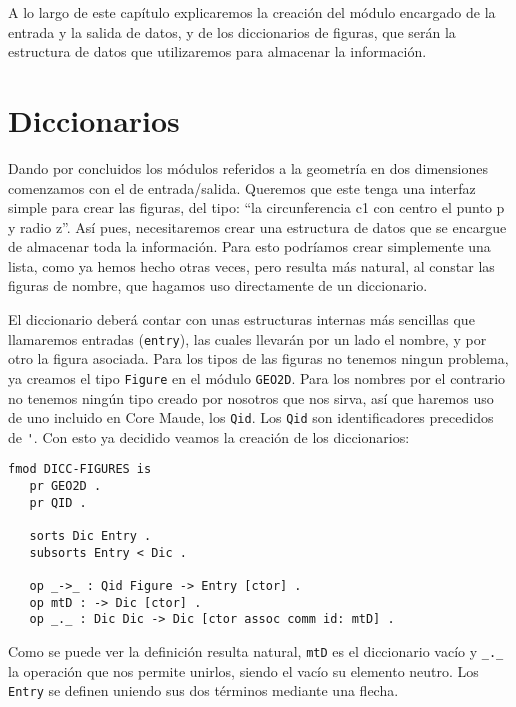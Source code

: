 
A lo largo de este capítulo explicaremos la creación del módulo encargado de la entrada y la salida de datos, y de los diccionarios de figuras, que serán la estructura de datos que utilizaremos para almacenar la información.\par

\section{Diccionarios}

Dando por concluidos los módulos referidos a la geometría en dos dimensiones comenzamos con el de entrada/salida. Queremos que este tenga una interfaz simple para crear las figuras, del tipo: ``la circunferencia c1 con centro el punto p y radio z''. Así pues, necesitaremos crear una estructura de datos que se encargue de almacenar toda la información. Para esto podríamos crear simplemente una lista, como ya hemos hecho otras veces, pero resulta más natural, al constar las figuras de nombre, que hagamos uso directamente de un diccionario. \par

El diccionario deberá contar con unas estructuras internas más sencillas que llamaremos entradas (\texttt{entry}), las cuales llevarán por un lado el nombre, y por otro la figura asociada. Para los tipos de las figuras no tenemos ningun problema, ya creamos el tipo \texttt{Figure} en el módulo \texttt{GEO2D}. Para los nombres por el contrario no tenemos ningún tipo creado por nosotros que nos sirva, así que haremos uso de uno incluido en Core Maude, los \texttt{Qid}. Los \texttt{Qid} son identificadores precedidos de \verb$'$. Con esto ya decidido veamos la creación de los diccionarios:\par

{\codesize
\begin{verbatim}
fmod DICC-FIGURES is
   pr GEO2D .
   pr QID .

   sorts Dic Entry .
   subsorts Entry < Dic .

   op _->_ : Qid Figure -> Entry [ctor] .
   op mtD : -> Dic [ctor] .
   op _._ : Dic Dic -> Dic [ctor assoc comm id: mtD] .

\end{verbatim}
}

Como se puede ver la definición resulta natural, \texttt{mtD} es el diccionario vacío y \verb"_._" la operación que nos permite unirlos, siendo el vacío su elemento neutro. Los \texttt{Entry} se definen uniendo sus dos términos mediante una flecha.\par

